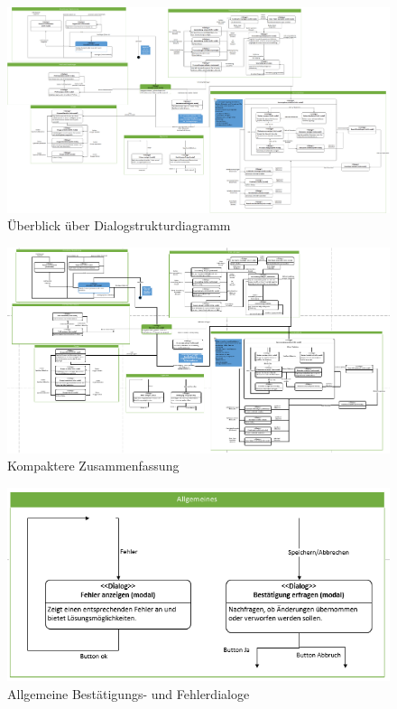\documentclass[12pt,a4paper]{article}
\begin{document}
{\begin{landscape}
\begin{figure}[H]
	\centering
	\includegraphics[width=18cm]{Bilder/Mockups/DSDGesamt.png}
	\caption{Überblick über Dialogstrukturdiagramm}
	\label{Dialogstrukturdiagramm}
\end{figure}

\begin{figure}[H]
	\centering
	\includegraphics[width=25cm]{Bilder/Mockups/DSDGesamtuebersicht.png}
	\caption{Kompaktere Zusammenfassung}
	\label{DialogstrukturdiagrammZusammenfassung}
\end{figure}
\begin{figure}[H]
	\centering
	\includegraphics[width=20cm]{Bilder/Mockups/DSDAllgemeines.png}
	\caption{Allgemeine Bestätigungs- und Fehlerdialoge}
	\label{DSDAllgemeines}
\end{figure}


\end{landscape}}
\end{document}
